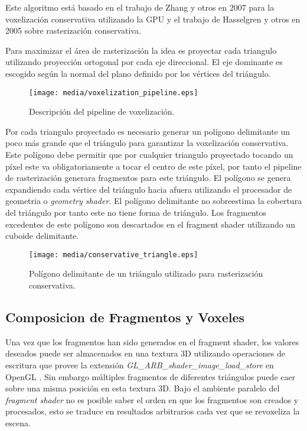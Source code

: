 Este algoritmo está basado en el trabajo de Zhang y otros en 2007 \cite{zhang2007conservative} para la voxelización conservativa utilizando la \ac{GPU} y el trabajo de Hasselgren y otros en 2005 \cite{hasselgren2005conservative} sobre rasterización conservativa.

Para maximizar el área de rasterización la idea es proyectar cada triangulo utilizando proyección ortogonal por cada eje direccional. El eje dominante es escogido según la normal del plano definido por los vértices del triángulo.

\begin{figure}[H]
	\centering
	\captionsetup{justification=centering}
	\texttt{[image: media/voxelization\_pipeline.eps]}
	\caption{Descripción del pipeline de voxelización.}
\end{figure}
 
Por cada triangulo proyectado es necesario generar un polígono delimitante un poco más grande que el triángulo para garantizar la voxelización conservativa. Este polígono debe permitir que por cualquier triangulo proyectado tocando un píxel este va obligatoriamente a tocar el centro de este píxel, por tanto el pipeline de rasterización generara fragmentos para este triángulo. El polígono se genera expandiendo cada vértice del triángulo hacia afuera utilizando el procesador de geometria o \emph{geometry shader}. El polígono delimitante no sobreestima la cobertura del triángulo por tanto este no tiene forma de triángulo. Los fragmentos excedentes de este polígono son descartados en el fragment shader utilizando un cuboide delimitante.

\begin{figure}[H]
	\centering
	\captionsetup{justification=centering}
	\texttt{[image: media/conservative\_triangle.eps]}
	\caption{Polígono delimitante de un triángulo utilizado para rasterización conservativa.}
	\label{fig:expanded_bbpolygon}
\end{figure}


\subsection{Composicion de Fragmentos y Voxeles}

Una vez que los fragmentos han sido generados en el fragment shader, los valores deseados puede ser almacenados en una textura 3D utilizando operaciones de escritura que provee la extensión \emph{{GL\_ARB\_shader\_image\_load\_store}} en OpenGL \cite{ImageLoadStore}. Sin embargo múltiples fragmentos de diferentes triángulos puede caer sobre una misma posición en esta textura 3D. Bajo el ambiente paralelo del \emph{fragment shader} no es posible saber el orden en que los fragmentos son creados y procesados, esto se traduce en resultados arbitrarios cada vez que se revoxeliza la escena.

